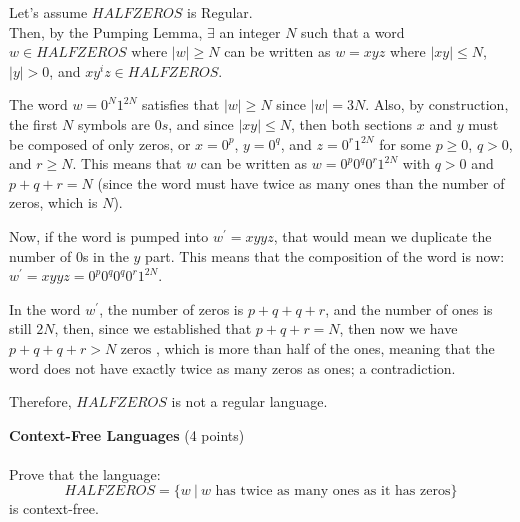 \documentclass[12pt]{article}
\newenvironment{question}[2][Question]{\begin{trivlist}
\item[\hskip \labelsep {\bfseries #1}\hskip \labelsep {\bfseries #2.}]}{\end{trivlist}}
\newenvironment{solution}[1][Solution:]{\begin{trivlist}
\item[\hskip \labelsep {\bfseries #1}\hskip \labelsep {\bfseries}]\color{blue}}{\end{trivlist}}
\begin{document}
\begin{solution}
Let's assume $HALFZEROS$ is Regular. \\
Then, by the Pumping Lemma, $\exists$ an integer $N$ such that a word $w  \in HALFZEROS \text{ where } \vert w \vert \geq N$ can be written as $w=xyz$ where $\vert xy \vert \leq N$, $\vert y \vert > 0$, and $xy^iz \in HALFZEROS$.

The word $w=0^{N}1^{2N}$ satisfies that $\vert w \vert \geq N$ since $\vert w \vert = 3N$. Also, by construction, the first $N$ symbols are $0s$, and since $\vert xy \vert \leq N$, then both sections $x$ and $y$ must be composed of only zeros, or $x = 0^p$, $y = 0^q$, and $z = 0^r1^{2N}$ for some $p\geq 0$, $q > 0$, and $r\geq N$. This means that $w$ can be written as $w=0^p0^q0^r1^{2N}$ with $q>0$ and $p+q+r = N$ (since the word must have twice as many ones than the number of zeros, which is $N$).

Now, if the word is pumped into $w^{\prime} = xyyz$, that would mean we duplicate the number of $0$s in the $y$ part. 
This means that the composition of the word is now: $w^{\prime} = xyyz = 0^p0^q0^q0^r1^{2N}$.

In the word $w^{\prime}$, the number of zeros is $p+q+q+r$, and the number of ones is still $2N$, then, since we established that $p+q+r = N$, then now we have $p+q+q+r > N \text{ zeros }$, which is more than half of the ones, meaning that the word does not have exactly twice as many zeros as ones; a contradiction. 

Therefore, $HALFZEROS$ is not a regular language.    
\end{solution}

\clearpage
\begin{question}{8}\textbf{Context-Free Languages} (4 points)\\\\
Prove that the language:
\[HALFZEROS = \{w \ | \ w \text{ has twice as many ones as it has zeros}\} \] is context-free.
\end{question}
\end{document}
